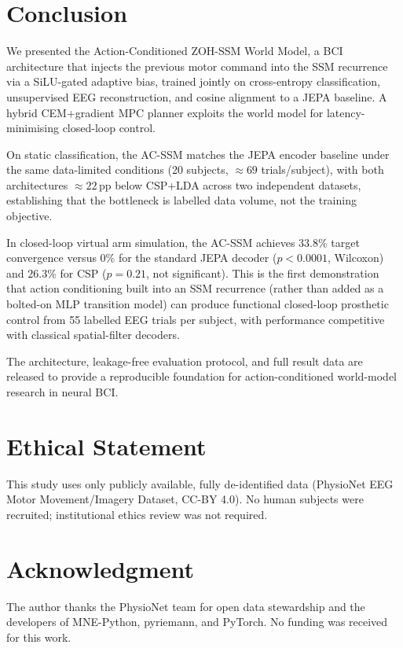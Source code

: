 \documentclass[journal]{IEEEtran}
\begin{document}
\section{Conclusion}
\label{sec:conclusion}

We presented the Action-Conditioned ZOH-SSM World Model, a BCI architecture that injects the previous motor command into the SSM recurrence via a SiLU-gated adaptive bias, trained jointly on cross-entropy classification, unsupervised EEG reconstruction, and cosine alignment to a JEPA baseline.
A hybrid CEM+gradient MPC planner exploits the world model for latency-minimising closed-loop control.

On static classification, the AC-SSM matches the JEPA encoder baseline under the same data-limited conditions (20 subjects, $\approx\!69$ trials/subject), with both architectures $\approx\!22$\,pp below CSP+LDA across two independent datasets, establishing that the bottleneck is labelled data volume, not the training objective.

In closed-loop virtual arm simulation, the AC-SSM achieves $33.8\%$ target convergence versus $0\%$ for the standard JEPA decoder ($p{<}0.0001$, Wilcoxon) and $26.3\%$ for CSP ($p=0.21$, not significant).
This is the first demonstration that action conditioning built into an SSM recurrence (rather than added as a bolted-on MLP transition model) can produce functional closed-loop prosthetic control from 55 labelled EEG trials per subject, with performance competitive with classical spatial-filter decoders.

The architecture, leakage-free evaluation protocol, and full result data are released to provide a reproducible foundation for action-conditioned world-model research in neural BCI.


\section*{Ethical Statement}
This study uses only publicly available, fully de-identified data (PhysioNet EEG Motor Movement/Imagery Dataset, CC-BY 4.0).
No human subjects were recruited; institutional ethics review was not required.

\section*{Acknowledgment}
The author thanks the PhysioNet team for open data stewardship and the developers of MNE-Python, pyriemann, and PyTorch.
No funding was received for this work.
\end{document}
